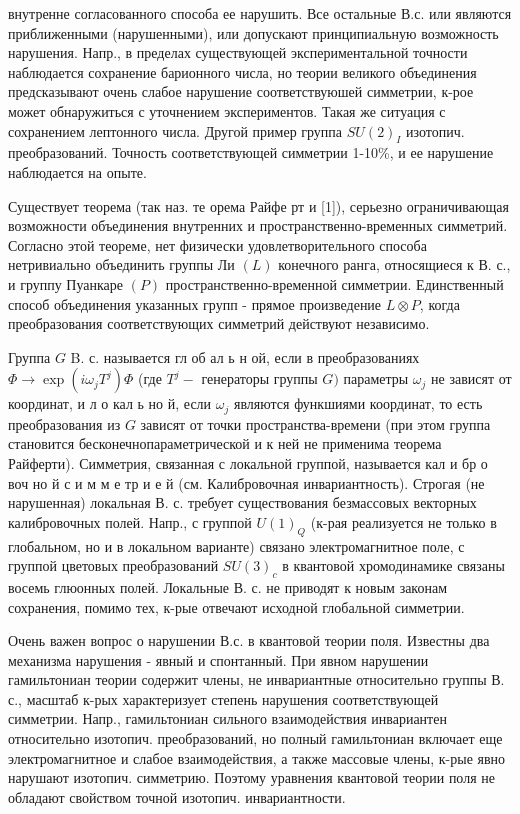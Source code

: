 \documentclass[10pt]{article}
\begin{document}
внутренне согласованного способа ее нарушить. Все остальные В.с. или являются приближенными (нарушенными), или допускают принципиальную возможность нарушения. Напр., в пределах существующей экспериментальной точности наблюдается сохранение барионного числа, но теории великого объединения предсказывают очень слабое нарушение соответствуюшей симметрии, к-рое может обнаружиться с уточнением экспериментов. Такая же ситуация с сохранением лептонного числа. Другой пример группа $S U(2)_{I}$ изотопич. преобразований. Точность соответствующей симметрии 1-10\%, и ее нарушение наблюдается на опыте.



Существует теорема (так наз. те орема Райфе рт и [1]), серьезно ограничивающая возможности объединения внутренних и пространственно-временных симметрий. Согласно этой теореме, нет физически удовлетворительного способа нетривиально объединить группы Ли $(L)$ конечного ранга, относящиеся к В. с., и группу Пуанкаре $(P)$ пространственно-временной симметрии. Единственный способ объединения указанных групп - прямое произведение $L \otimes P$, когда преобразования соответствующих симметрий действуют независимо.



Группа $G$ B. с. называется гл об ал ь н ой, если в преобразованиях $\Phi \rightarrow \exp \left(i \omega_{j} T^{j}\right) \Phi$ (где $T^{j}-$ генераторы группы $G)$ параметры $\omega_{j}$ не зависят от координат, и л о кал ь но й, если $\omega_{j}$ являются функшиями координат, то есть преобразования из $G$ зависят от точки пространства-времени (при этом группа становится бесконечнопараметрической и к ней не применима теорема Райферти). Симметрия, связанная с локальной группой, называется кал и бр о воч но й с и м м е тр и е й (см. Калибровочная инвариантность). Строгая (не нарушенная) локальная В. с. требует существования безмассовых векторных калибровочных полей. Напр., с группой $U(1)_{Q}$ (к-рая реализуется не только в глобальном, но и в локальном варианте) связано электромагнитное поле, с группой цветовых преобразований $S U(3)_{c}$ в квантовой хромодинамике связаны восемь глюонных полей. Локальные В. с. не приводят к новым законам сохранения, помимо тех, к-рые отвечают исходной глобальной симметрии.



Очень важен вопрос о нарушении В.с. в квантовой теории поля. Известны два механизма нарушения - явный и спонтанный. При явном нарушении гамильтониан теории содержит члены, не инвариантные относительно группы В. с., масштаб к-рых характеризует степень нарушения соответствующей симметрии. Напр., гамильтониан сильного взаимодействия инвариантен относительно изотопич. преобразований, но полный гамильтониан включает еще электромагнитное и слабое взаимодействия, а также массовые члены, к-рые явно нарушают изотопич. симметрию. Поэтому уравнения квантовой теории поля не обладают свойством точной изотопич. инвариантности.
\end{document}
